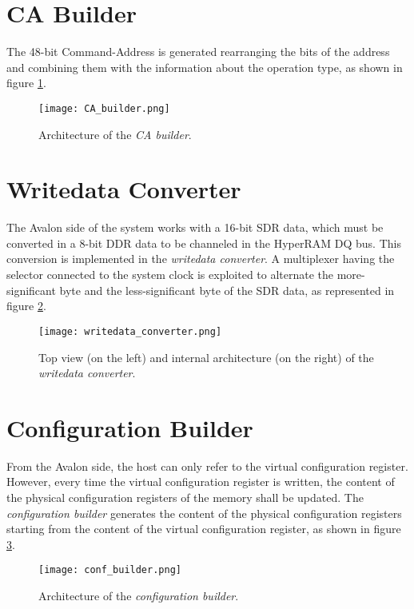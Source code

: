 \documentclass[10pt, english, a4paper, titlepage, oneside]{book}
\begin{document}
\section{CA Builder} \label{CA Builder}
\vspace{2mm}
The 48-bit Command-Address is generated rearranging the bits of the address and combining them with the information about the operation type, as shown in figure \ref{CA_builder}.
\vspace{6mm}
\begin{figure}[H]
    \centering
    \captionsetup{width=14cm}
    \texttt{[image: CA\_builder.png]}
    \vspace{4mm}
    \caption{\centering Architecture of the \textit{CA builder}.}
    \label{CA_builder}
\end{figure}
\vspace{4mm}
\section{Writedata Converter} \label{Writedata Converter}
\vspace{2mm}
The Avalon side of the system works with a 16-bit SDR data, which must be converted in a 8-bit DDR data to be channeled in the HyperRAM DQ bus. This conversion is implemented in the \textit{writedata converter}. A multiplexer having the selector connected to the system clock is exploited to alternate the more-significant byte and the less-significant byte of the SDR data, as represented in figure \ref{writedata_converter}.
\vspace{6mm}
\begin{figure}[H]
    \centering
    \captionsetup{width=16cm}
    \texttt{[image: writedata\_converter.png]}
    \vspace{4mm}
    \caption{\centering Top view (on the left) and internal architecture (on the right) of the \textit{writedata converter}.}
    \label{writedata_converter}
\end{figure}
\vspace{2mm}
\section{Configuration Builder} \label{Configuration Builder}
\vspace{2mm}
From the Avalon side, the host can only refer to the virtual configuration register. However, every time the virtual configuration register is written, the content of the physical configuration registers of the memory shall be updated. The \textit{configuration builder} generates the content of the physical configuration registers starting from the content of the virtual configuration register, as shown in figure \ref{conf_builder}.
\vspace{6mm}
\begin{figure}[H]
    \centering
    \captionsetup{width=14cm}
    \texttt{[image: conf\_builder.png]}
    \vspace{4mm}
    \caption{\centering Architecture of the \textit{configuration builder}.}
    \label{conf_builder}
\end{figure}
\vspace{4mm}
\end{document}
